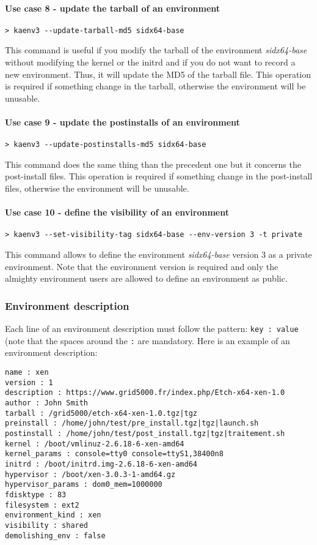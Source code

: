 \documentclass[a4wide,10pt,oneside]{book}
\begin{document}
\paragraph{Use case 8 - update the tarball of an environment}
\begin{verbatim}
> kaenv3 --update-tarball-md5 sidx64-base
\end{verbatim}
This command is useful if you modify the tarball of the environment \textit{sidx64-base} without modifying the kernel or the initrd and if you do not want to record a new environment. Thus, it will update the MD5 of the tarball file. This operation is required if something change in the tarball, otherwise the environment will be unusable.

\paragraph{Use case 9 - update the postinstalls of an environment}
\begin{verbatim}
> kaenv3 --update-postinstalls-md5 sidx64-base
\end{verbatim}
This command does the same thing than the precedent one but it concerns the post-install files. This operation is required if something change in the post-install files, otherwise the environment will be unusable.

\paragraph{Use case 10 - define the visibility of an environment}
\begin{verbatim}
> kaenv3 --set-visibility-tag sidx64-base --env-version 3 -t private
\end{verbatim}
This command allows to define the environment \textit{sidx64-base} version 3 as a private environment. Note that the environment version is required and only the almighty environment users are allowed to define an environment as public.

\subsubsection{Environment description}\label{sec:env_desc}
Each line of an environment description must follow the pattern: \texttt{key : value} (note that the spaces around the \texttt{:} are mandatory.
Here is an example of an environment description:
\begin{small}
\begin{verbatim}
name : xen
version : 1
description : https://www.grid5000.fr/index.php/Etch-x64-xen-1.0
author : John Smith
tarball : /grid5000/etch-x64-xen-1.0.tgz|tgz
preinstall : /home/john/test/pre_install.tgz|tgz|launch.sh
postinstall : /home/john/test/post_install.tgz|tgz|traitement.sh
kernel : /boot/vmlinuz-2.6.18-6-xen-amd64
kernel_params : console=tty0 console=ttyS1,38400n8
initrd : /boot/initrd.img-2.6.18-6-xen-amd64
hypervisor : /boot/xen-3.0.3-1-amd64.gz
hypervisor_params : dom0_mem=1000000
fdisktype : 83
filesystem : ext2
environment_kind : xen
visibility : shared
demolishing_env : false
\end{verbatim}
\end{small}
\end{document}
